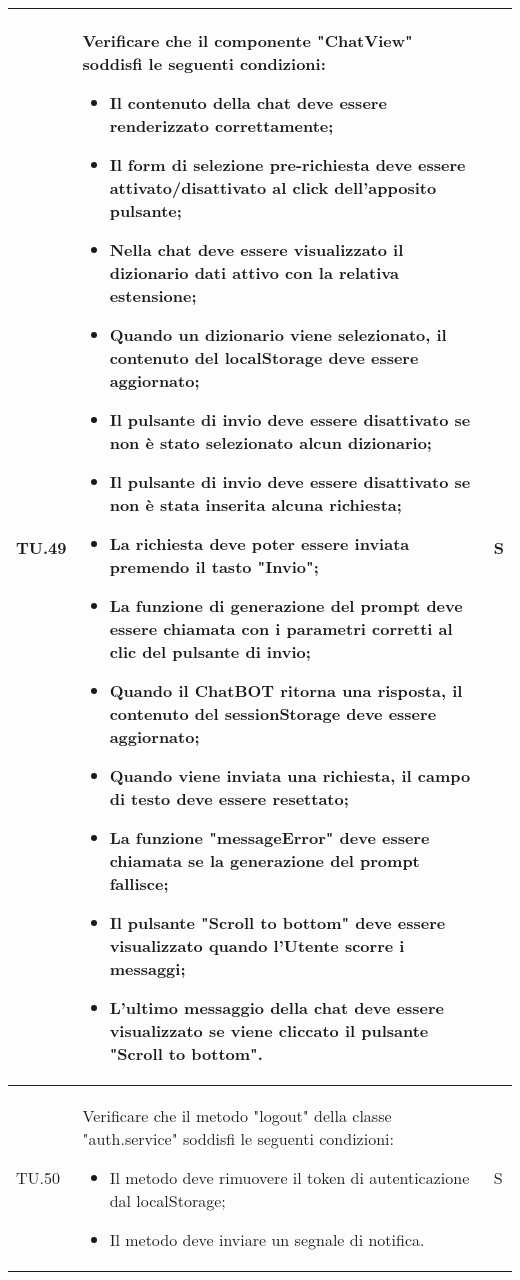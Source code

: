 \begin{adjustwidth}{-0.5cm}{-0.5cm}
\begin{longtable}{|P{1.5cm}|>{\raggedright}P{9.5cm}|>{\arraybackslash}P{1.5cm}|}
		\hline TU.49 & Verificare che il componente "ChatView" soddisfi le seguenti condizioni:
    \begin{itemize}
      \item Il contenuto della chat deve essere renderizzato correttamente;
			\item Il form di selezione pre-richiesta deve essere attivato/disattivato al click dell'apposito pulsante;
			\item Nella chat deve essere visualizzato il dizionario dati attivo con la relativa estensione;
			\item Quando un dizionario viene selezionato, il contenuto del localStorage deve essere aggiornato;
			\item Il pulsante di invio deve essere disattivato se non è stato selezionato alcun dizionario;
			\item Il pulsante di invio deve essere disattivato se non è stata inserita alcuna richiesta;
			\item La richiesta deve poter essere inviata premendo il tasto "Invio";
			\item La funzione di generazione del prompt deve essere chiamata con i parametri corretti al clic del pulsante di invio;
			\item Quando il ChatBOT ritorna una risposta, il contenuto del sessionStorage deve essere aggiornato;
			\item Quando viene inviata una richiesta, il campo di testo deve essere resettato;
			\item La funzione "messageError" deve essere chiamata se la generazione del prompt fallisce;
			\item Il pulsante "Scroll to bottom" deve essere visualizzato quando l'Utente scorre i messaggi;
			\item L'ultimo messaggio della chat deve essere visualizzato se viene cliccato il pulsante "Scroll to bottom".
    \end{itemize} & S \\

		\hline TU.50 & Verificare che il metodo "logout" della classe "auth.service" soddisfi le seguenti condizioni:
		\begin{itemize}
			\item Il metodo deve rimuovere il token di autenticazione dal localStorage;
			\item Il metodo deve inviare un segnale di notifica.
    \end{itemize} & S \\


\end{longtable}
\end{adjustwidth}
